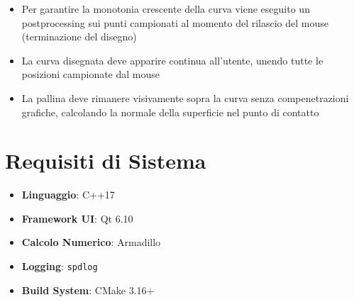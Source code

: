 \documentclass[a4paper,12pt]{article} %
\begin{document}
\begin{itemize}
    \item Per garantire la monotonia crescente della curva viene eseguito un postprocessing sui punti
          campionati al momento del rilascio del mouse (terminazione del disegno)
    \item La curva disegnata deve apparire continua all'utente, unendo tutte le posizioni campionate dal mouse
    \item La pallina deve rimanere visivamente sopra la curva senza compenetrazioni grafiche, calcolando
          la normale della superficie nel punto di contatto
\end{itemize}

\section{Requisiti di Sistema}

\begin{itemize}
    \item \textbf{Linguaggio}: C++17
    \item \textbf{Framework UI}: Qt 6.10
    \item \textbf{Calcolo Numerico}: Armadillo
    \item \textbf{Logging}: \texttt{spdlog}
    \item \textbf{Build System}: CMake 3.16+
\end{itemize}
\end{document}
